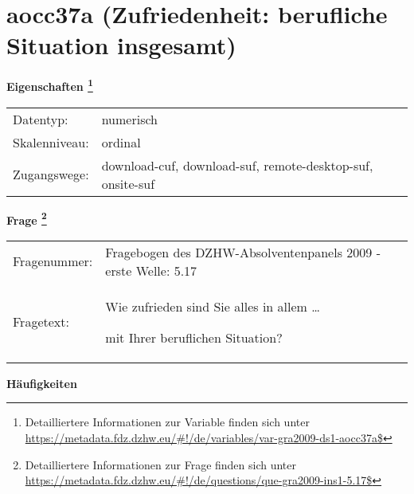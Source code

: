 
    \setcounter{footnote}{0}

    \vspace*{-1.8cm}
	\section{aocc37a (Zufriedenheit: berufliche Situation insgesamt)}
	\label{section:aocc37a}



    \vspace*{0.5cm}
    \noindent\textbf{Eigenschaften
	\footnote{Detailliertere Informationen zur Variable finden sich unter
		\url{https://metadata.fdz.dzhw.eu/\#!/de/variables/var-gra2009-ds1-aocc37a$}}}\\
	\begin{tabularx}{\hsize}{@{}lX}
	Datentyp: & numerisch \\
	Skalenniveau: & ordinal \\
	Zugangswege: &
	  download-cuf, 
	  download-suf, 
	  remote-desktop-suf, 
	  onsite-suf
 \\
    \end{tabularx}



				\vspace*{0.5cm}
                \noindent\textbf{Frage
	                \footnote{Detailliertere Informationen zur Frage finden sich unter
		              \url{https://metadata.fdz.dzhw.eu/\#!/de/questions/que-gra2009-ins1-5.17$}}}\\
				\begin{tabularx}{\hsize}{@{}lX}
					Fragenummer: &
					  Fragebogen des DZHW-Absolventenpanels 2009 - erste Welle:
					  5.17
 \\
					Fragetext: & Wie zufrieden sind Sie alles in allem …\par  mit Ihrer beruflichen Situation? \\
				\end{tabularx}





        		\vspace*{0.5cm}
                \noindent\textbf{Häufigkeiten}

